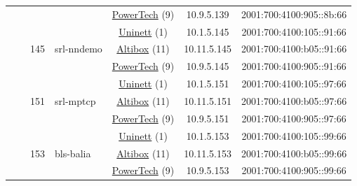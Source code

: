 \begin{small}
\begin{center}
\begin{longtable}{|c|c|c|c|c|c|c|c|}
  &  &  &  & \multicolumn{2}{|c|}{\tiny{\href{http://www.powertech.no}{PowerTech} (9)}} & \tiny{10.9.5.139} & \tiny{2001:700:4100:905::8b:66} \\* \cline{3-3}\cline{4-4}\cline{5-5}\cline{6-6}\cline{7-7}\cline{8-8}
  &  & \multirow{3}{*}{\tiny{145}} & \multicolumn{1}{|l|}{\multirow{3}{*}{\tiny{srl-nndemo}}} & \multicolumn{2}{|c|}{\tiny{\href{https://www.uninett.no}{Uninett} (1)}} & \tiny{10.1.5.145} & \tiny{2001:700:4100:105::91:66} \\* \cline{5-5}\cline{6-6}\cline{7-7}\cline{8-8}
  &  &  &  & \multicolumn{2}{|c|}{\tiny{\href{https://www.altibox.no}{Altibox} (11)}} & \tiny{10.11.5.145} & \tiny{2001:700:4100:b05::91:66} \\* \cline{5-5}\cline{6-6}\cline{7-7}\cline{8-8}
  &  &  &  & \multicolumn{2}{|c|}{\tiny{\href{http://www.powertech.no}{PowerTech} (9)}} & \tiny{10.9.5.145} & \tiny{2001:700:4100:905::91:66} \\* \cline{3-3}\cline{4-4}\cline{5-5}\cline{6-6}\cline{7-7}\cline{8-8}
  &  & \multirow{3}{*}{\tiny{151}} & \multicolumn{1}{|l|}{\multirow{3}{*}{\tiny{srl-mptcp}}} & \multicolumn{2}{|c|}{\tiny{\href{https://www.uninett.no}{Uninett} (1)}} & \tiny{10.1.5.151} & \tiny{2001:700:4100:105::97:66} \\* \cline{5-5}\cline{6-6}\cline{7-7}\cline{8-8}
  &  &  &  & \multicolumn{2}{|c|}{\tiny{\href{https://www.altibox.no}{Altibox} (11)}} & \tiny{10.11.5.151} & \tiny{2001:700:4100:b05::97:66} \\* \cline{5-5}\cline{6-6}\cline{7-7}\cline{8-8}
  &  &  &  & \multicolumn{2}{|c|}{\tiny{\href{http://www.powertech.no}{PowerTech} (9)}} & \tiny{10.9.5.151} & \tiny{2001:700:4100:905::97:66} \\* \cline{3-3}\cline{4-4}\cline{5-5}\cline{6-6}\cline{7-7}\cline{8-8}
  &  & \multirow{3}{*}{\tiny{153}} & \multicolumn{1}{|l|}{\multirow{3}{*}{\tiny{bls-balia}}} & \multicolumn{2}{|c|}{\tiny{\href{https://www.uninett.no}{Uninett} (1)}} & \tiny{10.1.5.153} & \tiny{2001:700:4100:105::99:66} \\* \cline{5-5}\cline{6-6}\cline{7-7}\cline{8-8}
  &  &  &  & \multicolumn{2}{|c|}{\tiny{\href{https://www.altibox.no}{Altibox} (11)}} & \tiny{10.11.5.153} & \tiny{2001:700:4100:b05::99:66} \\* \cline{5-5}\cline{6-6}\cline{7-7}\cline{8-8}
  &  &  &  & \multicolumn{2}{|c|}{\tiny{\href{http://www.powertech.no}{PowerTech} (9)}} & \tiny{10.9.5.153} & \tiny{2001:700:4100:905::99:66} \\* \cline{3-3}\cline{4-4}\cline{5-5}\cline{6-6}\cline{7-7}\cline{8-8}

\end{longtable}
\end{center}
\end{small}
